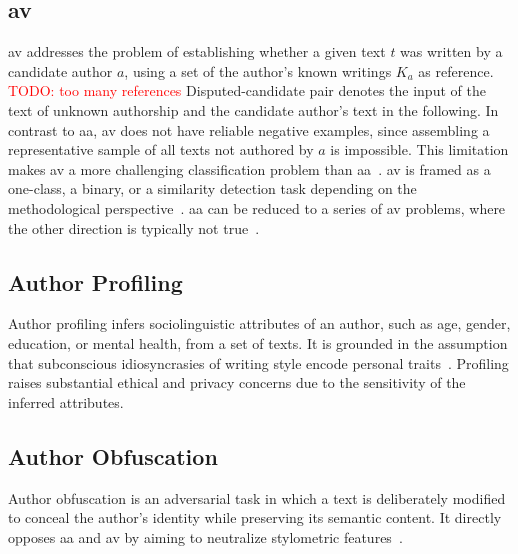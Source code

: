 \subsection{\Acl{av}}
\ac{av} addresses the problem of establishing whether a given text $t$ was written by a candidate author $a$, using a set of the author’s known writings $K_a$ as reference. 
\textcolor{red}{TODO: too many references}
Disputed-candidate pair denotes the input of the text of unknown authorship and the candidate author's text in the following.
In contrast to \ac{aa}, \ac{av} does not have reliable negative examples, since assembling a representative sample of all texts not authored by 
$a$ is impossible. 
This limitation makes \ac{av} a more challenging classification problem than \ac{aa}~\citep{llm_detection_av_2025,neal_surveying_2018,koppel_authorship_2004}.
\ac{av} is framed as a one-class, a binary, or a similarity detection task depending on the methodological perspective~\citep{neal_surveying_2018,koppel_authorship_2004}.  
\ac{aa} can be reduced to a series of \ac{av} problems, where the other direction is typically not true~\citep{barlas_cross_domain_2020,tyo_state_2022}.


\subsection{Author Profiling}
Author profiling infers sociolinguistic attributes of an author, such as age, gender, education, or mental health, from a set of texts. 
It is grounded in the assumption that subconscious idiosyncrasies of writing style encode personal traits~\citep{emmery_adversarial_2021,stamatatos_survey_2009,elmanarelbouanani_authorship_2014}. 
Profiling raises substantial ethical and privacy concerns due to the sensitivity of the inferred attributes.

\subsection{Author Obfuscation}
Author obfuscation is an adversarial task in which a text is deliberately modified to conceal the author's identity while preserving its semantic content. 
It directly opposes \ac{aa} and \ac{av} by aiming to neutralize stylometric features~\citep{bischoff_importance_2020,bevendorff_divergence_based_2020,gohsen_task_oriented_2024}. 

